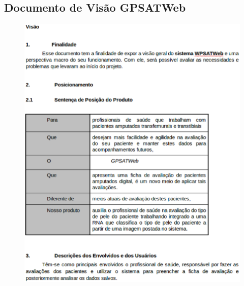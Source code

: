 \begin{apendicesenv}

\partapendices

\chapter{Documento de Visão GPSATWeb}

	\begin{figure}[H]
		    \label{fig24}
		        \includegraphics[keepaspectratio=true, scale=0.7]{editaveis/images/visaopag1.eps}
	\end{figure}
	\newpage
	\begin{figure}[H]
		    \label{fig25}

\end{figure}
\end{apendicesenv}
